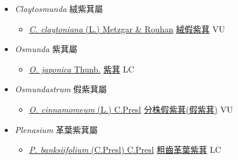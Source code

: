
  \begin{itemize}
 \item[] \textit{Claytosmunda} 絨紫萁屬
                    
  \begin{itemize}
        \item[] \href{http://www.theplantlist.org/tpl1.1/search?q=Claytosmunda+claytoniana}{\textit{C. claytoniana} (L.) Metzgar \& Rouhan}     \href{\detokenize{http://taibnet.sinica.edu.tw/chi/taibnet_species_list.php?T2=絨假紫萁&T2_new_value=true&fr=y}}{絨假紫萁} VU
  \end{itemize}
 \item[] \textit{Osmunda} 紫萁屬
                    
  \begin{itemize}
        \item[] \href{http://www.theplantlist.org/tpl1.1/search?q=Osmunda+japonica}{\textit{O. japonica} Thunb.}   \href{\detokenize{http://taibnet.sinica.edu.tw/chi/taibnet_species_list.php?T2=紫萁&T2_new_value=true&fr=y}}{紫萁} LC
  \end{itemize}
 \item[] \textit{Osmundastrum} 假紫萁屬
                    
  \begin{itemize}
        \item[] \href{http://www.theplantlist.org/tpl1.1/search?q=Osmundastrum+cinnamomeum}{\textit{O. cinnamomeum} (L.) C.Presl}     \href{\detokenize{http://taibnet.sinica.edu.tw/chi/taibnet_species_list.php?T2=分株假紫萁&T2_new_value=true&fr=y}}{分株假紫萁(假紫萁)}   VU
  \end{itemize}
 \item[] \textit{Plenasium} 革葉紫萁屬
                    
  \begin{itemize}
        \item[] \href{http://www.theplantlist.org/tpl1.1/search?q=Plenasium+banksiifolium}{\textit{P. banksiifolium} (C.Presl) C.Presl}     \href{\detokenize{http://taibnet.sinica.edu.tw/chi/taibnet_species_list.php?T2=粗齒革葉紫萁&T2_new_value=true&fr=y}}{粗齒革葉紫萁} LC
  \end{itemize}
  \end{itemize}
